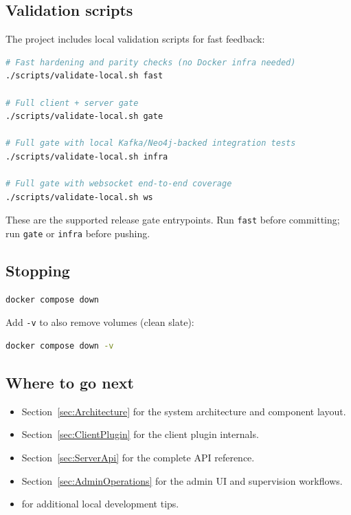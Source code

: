 \subsection{Validation scripts}

The project includes local validation scripts for fast feedback:

\begin{lstlisting}[language=bash,caption={Validation commands}]
# Fast hardening and parity checks (no Docker infra needed)
./scripts/validate-local.sh fast

# Full client + server gate
./scripts/validate-local.sh gate

# Full gate with local Kafka/Neo4j-backed integration tests
./scripts/validate-local.sh infra

# Full gate with websocket end-to-end coverage
./scripts/validate-local.sh ws
\end{lstlisting}

These are the supported release gate entrypoints. Run \texttt{fast} before
committing; run \texttt{gate} or \texttt{infra} before pushing.

\subsection{Stopping}

\begin{lstlisting}[language=bash,caption={Stop infrastructure}]
docker compose down
\end{lstlisting}

Add \texttt{-v} to also remove volumes (clean slate):

\begin{lstlisting}[language=bash,caption={Stop and remove volumes}]
docker compose down -v
\end{lstlisting}

\subsection{Where to go next}

\begin{itemize}
\item Section~\ref{sec:Architecture} for the system architecture and component
  layout.
\item Section~\ref{sec:ClientPlugin} for the client plugin internals.
\item Section~\ref{sec:ServerApi} for the complete API reference.
\item Section~\ref{sec:AdminOperations} for the admin UI and supervision
  workflows.
\item {} for additional local development tips.
\end{itemize}

